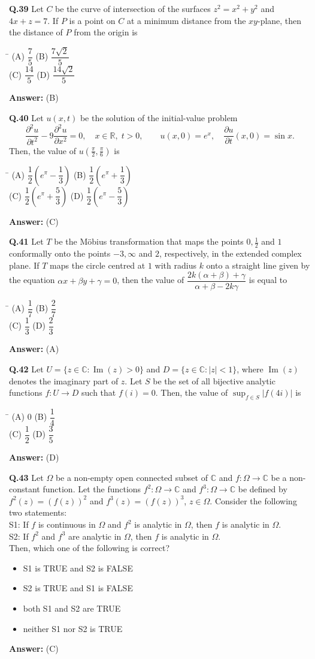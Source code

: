 \documentclass[11pt,a4paper]{article}
\newcommand{\optsfourA}[4]{%
  \begin{tabbing}
    \hspace{0.48\linewidth}\=\kill
    (A) #1 \> (B) #2 \\[2pt]
    (C) #3 \> (D) #4
  \end{tabbing}%
}
\newcommand{\optslistA}[4]{%
  \begin{itemize}
    \setlength{\itemsep}{2pt}\setlength{\parskip}{0pt}
    \item[(A)] #1
    \item[(B)] #2
    \item[(C)] #3
    \item[(D)] #4
  \end{itemize}%
}
\newcommand{\ans}[1]{\textbf{Answer:} #1\par\medskip}
\begin{document}
\textbf{Q.39} Let $C$ be the curve of intersection of the surfaces $z^2 = x^2 + y^2$ and $4x + z = 7$. If $P$ is a point on $C$ at a minimum distance from the $xy$-plane, then the distance of $P$ from the origin is
\optsfourA{$\dfrac{7}{5}$}{$\dfrac{7\sqrt{2}}{5}$}{$\dfrac{14}{5}$}{$\dfrac{14\sqrt{2}}{5}$}
\ans{(B)}

\textbf{Q.40} Let $u(x, t)$ be the solution of the initial-value problem
\[
  \frac{\partial^2 u}{\partial t^2} - 9\frac{\partial^2 u}{\partial x^2} = 0, \quad x \in \mathbb{R}, \; t > 0, \qquad u(x, 0) = e^x, \quad \frac{\partial u}{\partial t}(x, 0) = \sin x.
\]
Then, the value of $u\!\left(\frac{\pi}{2}, \frac{\pi}{6}\right)$ is
\optsfourA{$\dfrac{1}{2}\left(e^\pi - \dfrac{1}{3}\right)$}{$\dfrac{1}{2}\left(e^\pi + \dfrac{1}{3}\right)$}{$\dfrac{1}{2}\left(e^\pi + \dfrac{5}{3}\right)$}{$\dfrac{1}{2}\left(e^\pi - \dfrac{5}{3}\right)$}
\ans{(C)}

\textbf{Q.41} Let $T$ be the M\"obius transformation that maps the points $0, \frac{1}{2}$ and $1$ conformally onto the points $-3, \infty$ and $2$, respectively, in the extended complex plane. If $T$ maps the circle centred at $1$ with radius $k$ onto a straight line given by the equation $\alpha x + \beta y + \gamma = 0$, then the value of $\dfrac{2k(\alpha + \beta) + \gamma}{\alpha + \beta - 2k\gamma}$ is equal to
\optsfourA{$\dfrac{1}{7}$}{$\dfrac{2}{7}$}{$\dfrac{1}{3}$}{$\dfrac{2}{3}$}
\ans{(A)}

\textbf{Q.42} Let $U = \{z \in \mathbb{C} : \operatorname{Im}(z) > 0\}$ and $D = \{z \in \mathbb{C} : |z| < 1\}$, where $\operatorname{Im}(z)$ denotes the imaginary part of $z$. Let $S$ be the set of all bijective analytic functions $f : U \to D$ such that $f(i) = 0$. Then, the value of $\sup_{f \in S} |f(4i)|$ is
\optsfourA{$0$}{$\dfrac{1}{4}$}{$\dfrac{1}{2}$}{$\dfrac{3}{5}$}
\ans{(D)}

\textbf{Q.43} Let $\Omega$ be a non-empty open connected subset of $\mathbb{C}$ and $f : \Omega \to \mathbb{C}$ be a non-constant function. Let the functions $f^2 : \Omega \to \mathbb{C}$ and $f^3 : \Omega \to \mathbb{C}$ be defined by $f^2(z) = (f(z))^2$ and $f^3(z) = (f(z))^3$, $z \in \Omega$. Consider the following two statements:\\
S1: If $f$ is continuous in $\Omega$ and $f^2$ is analytic in $\Omega$, then $f$ is analytic in $\Omega$.\\
S2: If $f^2$ and $f^3$ are analytic in $\Omega$, then $f$ is analytic in $\Omega$.\\
Then, which one of the following is correct?
\optslistA{S1 is TRUE and S2 is FALSE}{S2 is TRUE and S1 is FALSE}{both S1 and S2 are TRUE}{neither S1 nor S2 is TRUE}
\ans{(C)}
\end{document}
